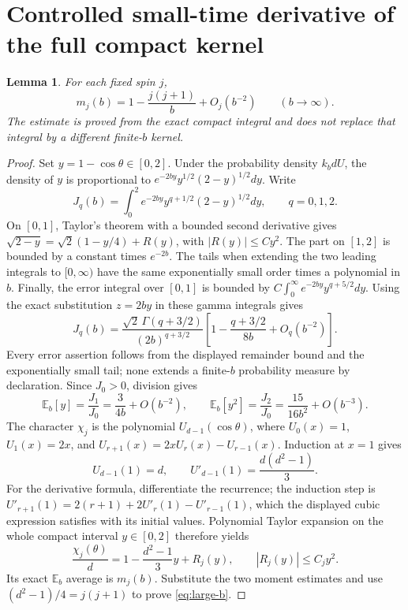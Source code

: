 \documentclass[11pt]{article}
\newtheorem{lemma}[theorem]{Lemma}
\begin{document}
\section{Controlled small-time derivative of the full compact kernel}

\begin{lemma}\label{lem:asymptotic}
For each fixed spin $j$,
\begin{equation}\label{eq:large-b}
 m_j(b)=1-\frac{j(j+1)}b+O_j(b^{-2})\qquad(b\longrightarrow\infty).
\end{equation}
The estimate is proved from the exact compact integral and does not
replace that integral by a different finite-$b$ kernel.
\end{lemma}
\begin{proof}
Set $y=1-\cos\theta\in[0,2]$. Under the probability density $k_b dU$,
the density of $y$ is proportional to
$e^{-2by}y^{1/2}(2-y)^{1/2}dy$. Write
\[
 J_q(b)=\int_0^2e^{-2by}y^{q+1/2}(2-y)^{1/2}dy,
 \qquad q=0,1,2.
\]
On $[0,1]$, Taylor's theorem with a bounded second derivative gives
$\sqrt{2-y}=\sqrt2(1-y/4)+R(y)$, with $|R(y)|\leq C y^2$.
The part on $[1,2]$ is bounded by a constant times $e^{-2b}$.
The tails when extending the two leading integrals to $[0,\infty)$
have the same exponentially small order times a polynomial in $b$.
Finally, the error integral over $[0,1]$ is bounded by
$C\int_0^\infty e^{-2by}y^{q+5/2}dy$.
Using the exact substitution $z=2by$ in these gamma integrals gives
\begin{equation}\label{eq:J-expansion}
 J_q(b)=\frac{\sqrt2\,\Gamma(q+3/2)}{(2b)^{q+3/2}}
 \left[1-\frac{q+3/2}{8b}+O_q(b^{-2})\right].
\end{equation}
Every error assertion follows from the displayed remainder bound and
the exponentially small tail; none extends a finite-$b$ probability
measure by declaration. Since $J_0>0$, division gives
\[
 \mathbb E_b[y]=\frac{J_1}{J_0}=\frac3{4b}+O(b^{-2}),\qquad
 \mathbb E_b[y^2]=\frac{J_2}{J_0}=\frac{15}{16b^2}+O(b^{-3}).
\]
The character $\chi_j$ is the polynomial $U_{d-1}(\cos\theta)$, where
$U_0(x)=1$, $U_1(x)=2x$, and
$U_{r+1}(x)=2xU_r(x)-U_{r-1}(x)$. Induction at $x=1$ gives
\[
 U_{d-1}(1)=d,\qquad U'_{d-1}(1)=\frac{d(d^2-1)}3.
\]
For the derivative formula, differentiate the recurrence; the induction
step is
$U'_{r+1}(1)=2(r+1)+2U'_r(1)-U'_{r-1}(1)$, which the displayed
cubic expression satisfies with its initial values. Polynomial Taylor
expansion on the whole compact interval $y\in[0,2]$ therefore yields
\[
 \frac{\chi_j(\theta)}d
 =1-\frac{d^2-1}{3}y+R_j(y),\qquad |R_j(y)|\leq C_jy^2.
\]
Its exact $\mathbb E_b$ average is $m_j(b)$. Substitute the two moment
estimates and use $(d^2-1)/4=j(j+1)$ to prove \eqref{eq:large-b}.
\end{proof}
\end{document}
